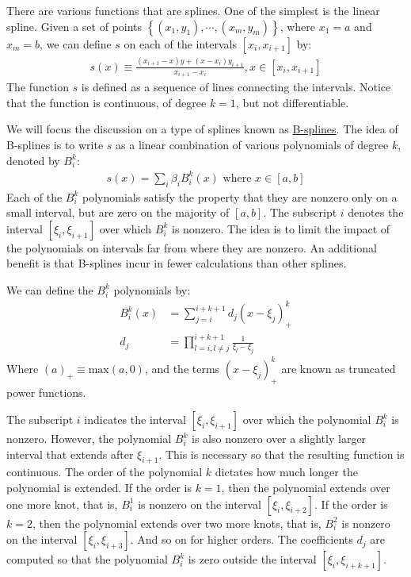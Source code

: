 \documentclass[12pt, a4paper]{article}
\newcommand{\Set}[1]{\left\{#1\right\}}
\begin{document}
There are various functions that are splines.
One of the simplest is the linear spline.
Given a set of points \(\Set{(x_1, y_1), \cdots, (x_m, y_m)}\), where \(x_1=a\) and \(x_m=b\), we can define \(s\) on each of the intervals \([x_i, x_{i+1}]\) by:
\begin{align*}
s(x)\equiv\frac{(x_{i+1}-x)y+(x-x_i)y_{i+1}}{x_{i+1}-x_i},  x\in[x_i,x_{i+1}]
\end{align*}
The function \(s\) is defined as a sequence of lines connecting the intervals.
Notice that the function is continuous, of degree \(k=1\), but not differentiable.

We will focus the discussion on a type of splines known as \href{https://en.wikipedia.org/wiki/B-spline}{B-splines}.
The idea of B-splines is to write \(s\) as a linear combination of various polynomials of degree \(k\), denoted by \(B_i^k\):
\begin{align*}
s(x)=\sum_{i}\beta_iB_i^k(x) \text{ where } x\in[a, b]
\end{align*}
Each of the \(B_i^k\) polynomials satisfy the property that they are nonzero only on a small interval, but are zero on the majority of \([a, b]\).
The subscript \(i\) denotes the interval \([\xi_{i}, \xi_{i+1}]\) over which \(B_i^k\) is nonzero.
The idea is to limit the impact of the polynomials on intervals far from where they are nonzero.
An additional benefit is that B-splines incur in fewer calculations than other splines.

We can define the \(B_i^k\) polynomials by:
\begin{align*}
B_i^k(x) &= \sum_{j=i}^{i+k+1}d_j(x-\xi_j)_{+}^k\\
d_j&=  \prod_{l=i,l\neq j}^{i+k+1}\frac{1}{\xi_l-\xi_j}
\end{align*}
Where \((a)_{+ }\equiv\text{max}(a, 0)\), and the terms \((x-\xi_j)_{+}^k\) are known as truncated power functions.

The subscript \(i\) indicates the interval \([\xi_i, \xi_{i+1}]\) over which the polynomial \(B_i^k\) is nonzero.
However, the polynomial \(B_i^k\) is also nonzero over a slightly larger interval that extends after \(\xi_{i+1}\).
This is necessary so that the resulting function is continuous.
The order of the polynomial \(k\) dictates how much longer the polynomial is extended.
If the order is \(k=1\), then the polynomial extends over one more knot, that is, \(B_i^1\) is nonzero on the interval \([\xi_i, \xi_{i+2}]\).
If the order is \(k=2\), then the polynomial extends over two more knots, that is, \(B_i^2\) is nonzero on the interval \([\xi_i, \xi_{i+3}]\).
And so on for higher orders.
The coefficients \(d_j\) are computed so that the polynomial \(B_i^k\) is zero outside the interval \([\xi_i, \xi_{i+k+1}]\).
\end{document}
